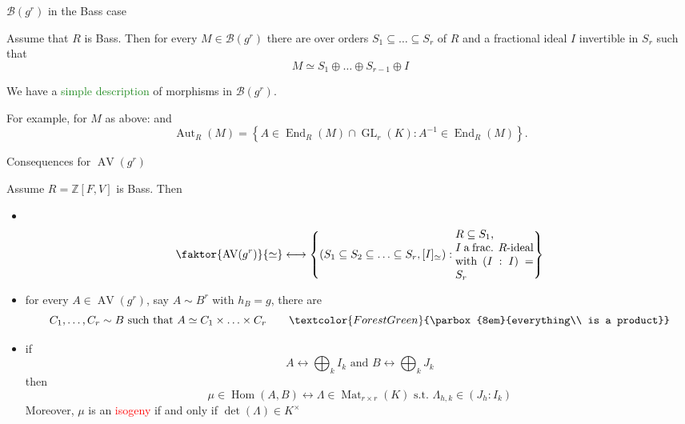 \documentclass[usenames,dvipsnames]{beamer}
\def\Z{\mathbb{Z}}
\DeclareMathOperator{\AV}{AV}
\DeclareMathOperator{\Mat}{Mat}
\DeclareMathOperator{\Aut}{Aut}
\DeclareMathOperator{\Hom}{Hom}
\DeclareMathOperator{\End}{End}
\DeclareMathOperator{\GL}{GL}
\newcommand{\cB}{{\mathcal B}}
\newcommand{\set}[1]{\left\lbrace#1\right\rbrace }
\newcommand{\red}[1]{\textcolor{red}{#1}}
\newcommand{\green}[1]{\textcolor{ForestGreen}{#1}}
\begin{document}
\begin{frame}{ $\cB(g^r)$ in the Bass case }
\begin{corollary}
 Assume that $R$ is Bass. Then for every $M\in \cB(g^r)$ there are over orders $S_1\subseteq \ldots \subseteq S_r$ of $R$ and a fractional ideal $I$ invertible in $S_r$ such that
 \[ M\simeq S_1\oplus\ldots\oplus S_{r-1}\oplus I \]
\end{corollary}
  \pause We have a \green{simple description} of morphisms in $\cB(g^r)$.

  For example, for $M$ as above:
  \pause {\small
\[ \End_R(M) = 
    \begin{pmatrix}
    S_1 	& S_2 	   & \ldots & S_{r-1} & I \\
    (S_1:S_2) 	& S_2 	   & \ldots & S_{r-1} & I \\
    \vdots 	& \vdots   & \ddots & \vdots  & \vdots \\
    (S_1:S_{r-1}) 	& (S_2:S_{r-1})& \ldots & S_{r-1} & I \\
    (S_1:I) 	& (S_2:I)& \ldots & (S_{r-1}:I) & (I:I)
    \end{pmatrix}
    \]
}
and 
\pause \vspace{-1em}
\[\Aut_R(M)=\set{ A \in \End_R(M) \cap \GL_r(K) : A^{-1} \in \End_R(M) }.\]
\end{frame}


\begin{frame}{ Consequences for $\AV(g^r)$ }
\begin{corollary}
Assume $R=\Z[F,V]$ is Bass.
Then
 \begin{itemize}
  \pause \vspace{1em} \item \
  \vspace{-3em}
  \[ \faktor{\AV(g^r)}{ \simeq } \longleftrightarrow \set{ (S_1\subseteq S_2 \subseteq \ldots \subseteq S_r , [I]_{\simeq}) : \parbox{7em}{$R\subseteq S_1$,\\ $I$ a frac. $R$-ideal with $(I:I)=S_r$}  } \]
  \pause \vspace{-1em} \item for every $A\in \AV(g^r)$, say $A\sim B^r$ with $h_B=g$, there are 
  \vspace{-1em}
  \[C_1,\ldots,C_r \sim B \text{ such that } A \simeq C_1\times \ldots \times C_r \qquad\green{\parbox{8em}{everything\\ is a product}} \]
  \vspace{-1em}
  \pause \item if 
  \vspace{-1em}
  \[ A \longleftrightarrow \bigoplus_k I_k \text{ and } B \longleftrightarrow \bigoplus_k J_k \]
  \vspace{-1em}
  then 
  \vspace{-1em}
  \[ \mu \in \Hom(A,B) \longleftrightarrow \Lambda \in \Mat_{r\times r}(K) \text{ s.t. } \Lambda_{h,k}\in (J_h:I_k) \]
  \pause Moreover, $\mu$ is an \red{isogeny} if and only if $\det(\Lambda) \in K^\times$
 \end{itemize}
\end{corollary}
\end{frame}
\end{document}
